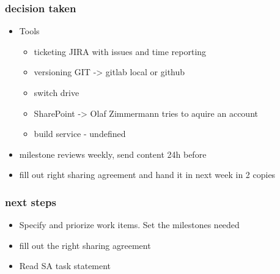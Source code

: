 \documentclass{article}
\begin{document}
\subsubsection{decision taken}

\begin{itemize}
    \item Tools
        \begin{itemize}
            \item ticketing JIRA with issues and time reporting 
            \item versioning GIT -> gitlab local or github
            \item switch drive
            \item SharePoint -> Olaf Zimmermann tries to aquire an account
            \item build service - undefined
        \end{itemize}
    \item milestone reviews weekly, send content 24h before
    \item fill out right sharing agreement and hand it in next week in 2 copies
\end{itemize}

\subsubsection{next steps}
\begin{itemize}
    \item Specify and priorize work items. Set the milestones needed
    \item fill out the right sharing agreement
    \item Read SA task statement 
\end{itemize}
\end{document}
